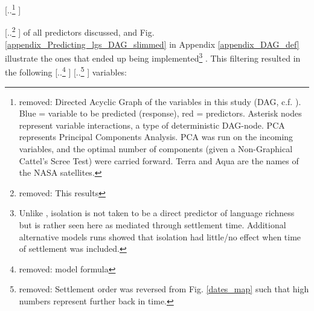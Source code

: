 \documentclass[unnumsec,webpdf,modern,medium]{oup-authoring-template}
\providecommand{\DIFaddtex}[1]{{\protect\color{blue} \sf #1}} %
\providecommand{\DIFdeltex}[1]{{\protect\color{red} [..\footnote{removed: #1} ]}} %
\providecommand{\DIFaddbegin}{} %
\providecommand{\DIFaddend}{} %
\providecommand{\DIFdelbegin}{} %
\providecommand{\DIFdelend}{} %
\providecommand{\DIFdelFL}[1]{\DIFdel{#1}} %
\providecommand{\DIFadd}[1]{\texorpdfstring{\DIFaddtex{#1}}{#1}} %
\providecommand{\DIFdel}[1]{\texorpdfstring{\DIFdeltex{#1}}{}} %
\newcommand{\DIFscaledelfig}{0.5}
\newlength{\DIFdelgraphicswidth} %
\newlength{\DIFdelgraphicsheight} %
\newcommand{\DIFaddincludegraphics}[2][]{{\color{blue}\fbox{\DIFOincludegraphics[#1]{#2}}}} %
\newcommand{\DIFdelincludegraphics}[2][]{%
\sbox{\DIFdelgraphicsbox}{\DIFOincludegraphics[#1]{#2}}%
\settoboxwidth{\DIFdelgraphicswidth}{\DIFdelgraphicsbox} %
\settoboxtotalheight{\DIFdelgraphicsheight}{\DIFdelgraphicsbox} %
\scalebox{\DIFscaledelfig}{%
\parbox[b]{\DIFdelgraphicswidth}{\usebox{\DIFdelgraphicsbox}\\[-\baselineskip] \rule{\DIFdelgraphicswidth}{0em}}\llap{\resizebox{\DIFdelgraphicswidth}{\DIFdelgraphicsheight}{%
\setlength{\unitlength}{\DIFdelgraphicswidth}%
\begin{picture}(1,1)%
\thicklines\linethickness{2pt} %
{\color[rgb]{1,0,0}\put(0,0){\framebox(1,1){}}}%
{\color[rgb]{1,0,0}\put(0,0){\line( 1,1){1}}}%
{\color[rgb]{1,0,0}\put(0,1){\line(1,-1){1}}}%
\end{picture}%
}\hspace*{3pt}}} %
} %
\DeclareRobustCommand{\DIFaddbegin}{\DIFOaddbegin \let\includegraphics\DIFaddincludegraphics} %
\DeclareRobustCommand{\DIFaddend}{\DIFOaddend \let\includegraphics\DIFOincludegraphics} %
\DeclareRobustCommand{\DIFdelbegin}{\DIFOdelbegin \let\includegraphics\DIFdelincludegraphics} %
\DeclareRobustCommand{\DIFdelend}{\DIFOaddend \let\includegraphics\DIFOincludegraphics} %
\begin{document}
{%
\DIFdelFL{Directed Acyclic Graph of the variables in this study (DAG, c.f. \cite{mcelreath2020statistical}). Blue = variable to be predicted (response), red = predictors. Asterisk nodes represent variable interactions, a type of deterministic DAG-node. PCA represents Principal Components Analysis. PCA was run on the incoming variables, and the optimal number of components (given a Non-Graphical Cattel's Scree Test) were carried forward. Terra and Aqua are the names of the NASA satellites.}}

\DIFdel{This results }\DIFdelend \DIFaddbegin \DIFadd{of all predictors discussed, and Fig. \ref{appendix_Predicting_lgs_DAG_slimmed} in Appendix \ref{appendix_DAG_def} illustrate the ones that ended up being implemented}\footnote{\DIFadd{Unlike \citet{gavin2012island}, isolation is not taken to be a direct predictor of language richness but is rather seen here as mediated through settlement time. Additional alternative models runs showed that isolation had little/no effect when time of settlement was included.}}\DIFadd{. This filtering resulted }\DIFaddend in the following \DIFdelbegin \DIFdel{model formula}%
\DIFdel{Settlement order was reversed from Fig. \ref{dates_map} such that high numbers represent further back in time.}%
\DIFdelend \DIFaddbegin \DIFadd{variables}\DIFaddend :
\end{document}
